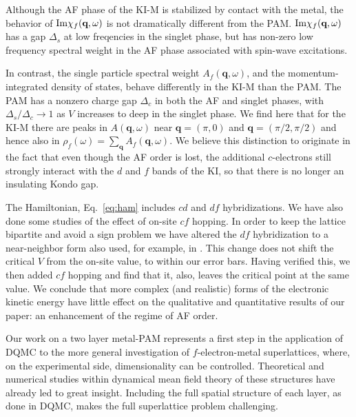 \documentclass[pra,letterpaper,10pt,twocolumn]{revtex4}
\begin{document}
Although the AF phase of the KI-M is stabilized by contact with the
metal, the behavior of $ \textup{Im}\chi_f(\textbf{q},\omega)$ is not dramatically
different from the PAM.  $ \textup{Im}\chi_f(\textbf{q},\omega)$ has a gap $\Delta_s$ at low
freqencies in the singlet phase, but has non-zero low 
frequency spectral weight in the AF phase associated with spin-wave
excitations.  

In contrast,
the single particle spectral weight $A_f(\textbf{q},\omega)$,
and the momentum-integrated density of states,
behave differently in the KI-M than the PAM.  The PAM has a nonzero 
charge gap $\Delta_c$ in both the
AF and singlet phases\cite{Vekic95}, with 
$\Delta_s/\Delta_c \rightarrow 1$  as $V$ increases to deep in
the singlet phase.  We find here that for the KI-M there
are peaks in $A(\textbf{q},\omega)$ near $\textbf{q}=(\pi,0)$ and $\textbf{q}=(\pi/2,\pi/2)$
and hence also in $\rho_f(\omega)=\sum_{\textbf{q}} A_f(\textbf{q},\omega)$.
We believe this distinction to originate in the fact that
even though the AF order is lost, the additional $c$-electrons
still strongly interact with the $d$ and $f$ bands of the KI, so
that there is no longer an insulating Kondo gap.

The Hamiltonian, Eq.~\ref{eq:ham} includes $cd$ and $df$ hybridizations.
We have also done some studies of the effect of on-site $cf$ hopping.
In order to keep the lattice bipartite and avoid a sign problem we have
altered the $df$ hybridization to a near-neighbor form also used, for
example, in \cite{held00}.  This change does not shift the critical $V$
from the on-site value, to within our error bars.  Having verified this,
we then added $cf$ hopping and find that it, also, leaves the critical
point at the same value.  We conclude that more complex (and realistic)
forms of the electronic kinetic energy have little effect on the
qualitative and quantitative results of our paper:  an enhancement of
the regime of AF order.  


Our work on a two layer metal-PAM represents a first step in the
application of DQMC to the more general investigation of $f$-electron-metal superlattices, where, on the experimental side,
dimensionality can be controlled\cite{shishido10}.  Theoretical and
numerical studies within dynamical mean field
theory\cite{peters13,okamoto08,tada13,peters14} of these structures have
already led to great insight.  Including the full spatial structure of
each layer, as done in DQMC, makes the full superlattice problem
challenging.

\end{document}
